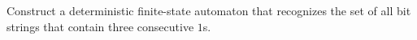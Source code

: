\documentclass[../main.tex]{subfiles}
\begin{document}
Construct a deterministic finite-state automaton that recognizes the set of all bit strings that contain three consecutive $1$s.

\solution
\end{document}
